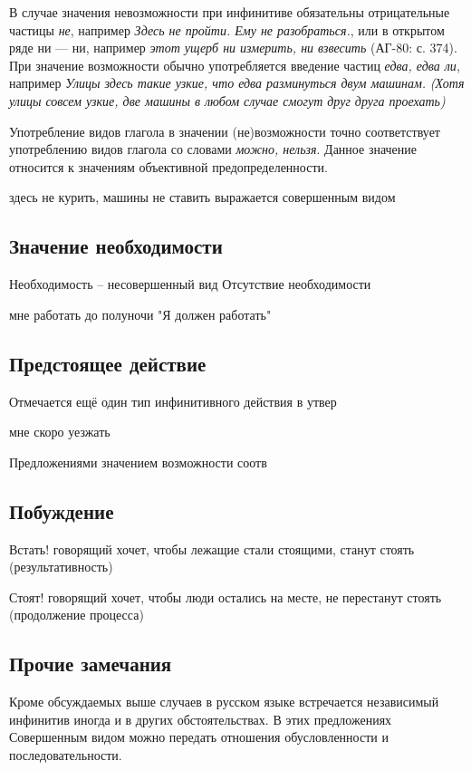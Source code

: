 В случае значения невозможности при инфинитиве обязательны отрицательные частицы \textit{не}, например \textit{Здесь не пройти. Ему не разобраться.}, или в открытом ряде ни --- ни, например \textit{этот ущерб ни измерить, ни взвесить} (АГ-80: с. 374). При значение возможности обычно употребляется введение частиц \textit{едва, едва ли}, например \textit{Улицы здесь такие узкие, что едва разминуться двум машинам.} \textit{(Хотя улицы совсем узкие, две машины в любом случае смогут друг друга проехать)}

Употребление видов глагола в значении (не)возможности точно соответствует употреблению видов глагола со словами \textit{можно, нельзя}. Данное значение относится к значениям объективной предопределенности. 

здесь не курить, машины не ставить
выражается совершенным видом

\subsection{Значение необходимости}

Необходимость -- несовершенный вид
Отсутствие необходимости

мне работать до полуночи
"Я должен работать"

\subsection{Предстоящее действие}

Отмечается ещё один тип инфинитивного действия в утвер

мне скоро уезжать


Предложениями значением возможности соотв

\subsection{Побуждение}

Встать! говорящий хочет, чтобы лежащие стали стоящими, станут стоять (результативность)

Стоят! говорящий хочет, чтобы люди остались на месте, не перестанут стоять (продолжение процесса)

\subsection{Прочие замечания}

Кроме обсуждаемых выше случаев в русском языке встречается независимый инфинитив иногда и в других обстоятельствах. В этих предложениях Совершенным видом можно передать отношения обусловленности и последовательности. 

